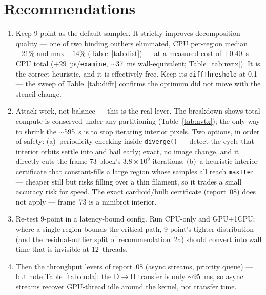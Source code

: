 \documentclass[
	english,
	letterpaper, oneside
]{article}
\begin{document}
\section{Recommendations}

\begin{enumerate}
    \item Keep 9-point as the default sampler. It strictly improves
    decomposition quality --- one of two binding outliers eliminated, CPU
    per-region median $-21\%$ and max $-14\%$ (Table~\ref{tab:dist}) --- at a
    measured cost of $+0.40$~s CPU total ($+29$~µs/\texttt{examine}, $\sim$37~ms
    wall-equivalent; Table~\ref{tab:nvtx}). It is the correct heuristic, and it
    is effectively free. Keep its \texttt{diffThreshold} at 0.1 --- the sweep of
    Table~\ref{tab:difft} confirms the optimum did not move with the stencil
    change.

    \item Attack work, not balance --- this is the real lever. The
    breakdown shows total compute is conserved under any partitioning
    (Table~\ref{tab:nvtx}); the only way to shrink the $\sim$595~s is to stop
    iterating interior pixels. Two options, in order of safety:
    (a)~periodicity checking inside \texttt{diverge()} --- detect the
    cycle that interior orbits settle into and bail early; exact, no image
    change, and it directly cuts the frame-73 block's $3.8\times10^9$ iterations;
    (b)~a heuristic interior certificate that constant-fills a large
    region whose samples all reach \texttt{maxIter} --- cheaper still but risks
    filling over a thin filament, so it trades a small accuracy risk for speed.
    The exact cardioid/bulb certificate (report~08) does not apply --- frame~73
    is a minibrot interior.

    \item Re-test 9-point in a latency-bound config. Run CPU-only and
    GPU+1CPU; where a single region bounds the critical path, 9-point's tighter
    distribution (and the residual-outlier split of recommendation~2a) should
    convert into wall time that is invisible at 12~threads.

    \item Then the throughput levers of report~08 (async streams,
    priority queue) --- but note Table~\ref{tab:cuda}: the D$\rightarrow$H
    transfer is only $\sim$95~ms, so async streams recover GPU-thread idle
    around the kernel, not transfer time.
\end{enumerate}
\end{document}

